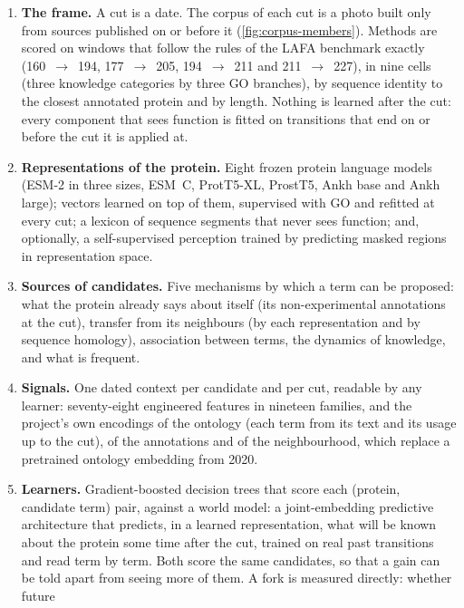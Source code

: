 \begin{enumerate}[label=\textbf{Stage \arabic*.}, start=0]
  \item \textbf{The frame.} A cut is a date. The corpus of each cut is a photo built
        only from sources published on or before it (\cref{fig:corpus-members}).
        Methods are scored on windows that follow the rules of the LAFA benchmark
        exactly (160~$\to$~194, 177~$\to$~205, 194~$\to$~211 and 211~$\to$~227), in
        nine cells (three knowledge categories by three GO branches), by sequence
        identity to the closest annotated protein and by length. Nothing is learned
        after the cut: every component that sees function is fitted on transitions that
        end on or before the cut it is applied at.
  \item \textbf{Representations of the protein.} Eight frozen protein language models
        (ESM-2 in three sizes, ESM~C, ProtT5-XL, ProstT5, Ankh base and Ankh large);
        vectors learned on top of them, supervised with GO and refitted at every cut;
        a lexicon of sequence segments that never sees function; and, optionally, a
        self-supervised perception trained by predicting masked regions in
        representation space.
  \item \textbf{Sources of candidates.} Five mechanisms by which a term can be
        proposed: what the protein already says about itself (its non-experimental
        annotations at the cut), transfer from its neighbours (by each representation
        and by sequence homology), association between terms, the dynamics of knowledge,
        and what is frequent.
  \item \textbf{Signals.} One dated context per candidate and per cut, readable by any
        learner: seventy-eight engineered features in nineteen families, and the
        project's own encodings of the ontology (each term from its text and its usage
        up to the cut), of the annotations and of the neighbourhood, which replace a
        pretrained ontology embedding from 2020.
  \item \textbf{Learners.} Gradient-boosted decision trees that score each (protein,
        candidate term) pair, against a world model: a joint-embedding predictive
        architecture that predicts, in a learned representation, what will be known
        about the protein some time after the cut, trained on real past transitions and
        read term by term. Both score the same candidates, so that a gain can be told
        apart from seeing more of them. A fork is measured directly: whether future

\end{enumerate}
